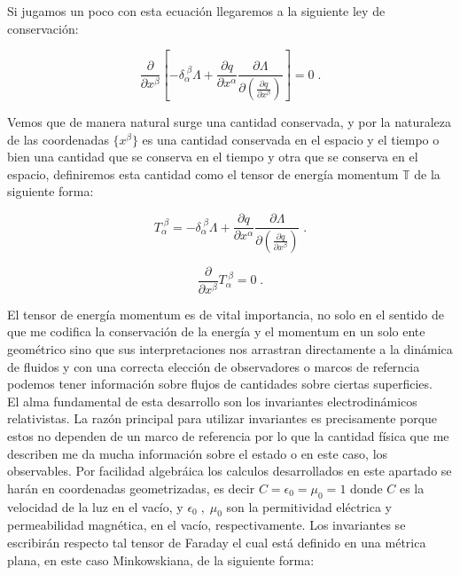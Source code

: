         Si jugamos un poco con esta ecuación llegaremos a la siguiente ley de conservación:

        \begin{equation}
            \frac{\partial}{\partial x^{\beta}}\left[-\delta_{\alpha}^{\;\beta}\Lambda + \frac{\partial q}{\partial x^{\alpha}}\frac{\partial \Lambda}{\partial \left(\frac{\partial q}{\partial x^{\beta}} \right)} \right] = 0 \; .
        \end{equation}

        Vemos que de manera natural surge una cantidad conservada, y por la naturaleza de las coordenadas $\{x^{\beta}\}$ es una cantidad conservada en el espacio y el tiempo o bien una cantidad que se conserva en el tiempo y otra que se conserva en el espacio, definiremos esta cantidad como el tensor de energía momentum $\mathbb{T}$ de la siguiente forma:

        \begin{equation}
            T^{\;\beta}_{\alpha} = -\delta_{\alpha}^{\;\beta}\Lambda + \frac{\partial q}{\partial x^{\alpha}}\frac{\partial \Lambda}{\partial \left(\frac{\partial q}{\partial x^{\beta}} \right)}\;.
        \end{equation}  

        \begin{equation*}
            \frac{\partial}{\partial x^{\beta}} T^{\;\beta}_{\alpha} = 0\;.
        \end{equation*}

        El tensor de energía momentum es de vital importancia, no solo en el sentido de que me codifica la conservación de la energía y el momentum en un solo ente geométrico sino que sus interpretaciones nos arrastran directamente a la dinámica de fluidos y con una correcta elección de observadores o marcos de referncia podemos tener información sobre flujos de cantidades sobre ciertas superficies.\\


        El alma fundamental de esta desarrollo son los invariantes electrodinámicos relativistas. La razón principal para utilizar invariantes es precisamente porque estos no dependen de un marco de referencia por lo que la cantidad física que me describen me da mucha información sobre el estado o en este caso, los observables. Por facilidad algebráica los calculos desarrollados en este apartado se harán en coordenadas geometrizadas, es decir $C = \epsilon_0 = \mu_0 = 1$ donde $C$ es la velocidad de la luz en el vacío, y $\epsilon_0 \;,\; \mu_0$ son la permitividad eléctrica y permeabilidad magnética, en el vacío, respectivamente. Los invariantes se escribirán respecto tal tensor de Faraday el cual está definido en una métrica plana, en este caso Minkowskiana, de la siguiente forma: 

